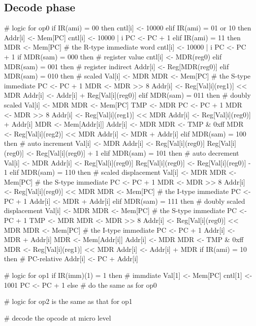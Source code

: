 \documentclass[12pt]{article}
\begin{document}
\subsection{Decode phase}
\begin{verbatimtab}
# logic for op0
if IR(ami) = 00 then
	cntl[i] <- 10000
elif IR(ami) = 01 or 10 then
	Addr[i] <- Mem[PC]
	cntl[i] <- 10000 | i
	PC <- PC + 1
elif IR(ami) = 11 then
	MDR <- Mem[PC] # the R-type immediate word
	cntl[i] <- 10000 | i
	PC <- PC + 1
	if MDR(sam) = 000 then # register value
		cntl[i] <- MDR(reg0)
	elif MDR(sam) = 001 then # register indirect
		Addr[i] <- Reg[MDR(reg0)]
	elif MDR(sam) = 010 then # scaled
		Val[i] <- MDR
		MDR <- Mem[PC] # the S-type immediate
		PC <- PC + 1
		MDR <- MDR >> 8
		Addr[i] <- Reg[Val[i](reg1)] << MDR
		Addr[i] <- Addr[i] + Reg[Val[i](reg0)]
	elif MDR(sam) = 011 then # doubly scaled
                Val[i] <- MDR
                MDR <- Mem[PC]
                TMP <- MDR
                PC <- PC + 1
                MDR <- MDR >> 8
                Addr[i] <- Reg[Val[i](reg1)] << MDR
                Addr[i] <- Reg[Val[i](reg0)] + Addr[i]
                MDR <- Mem[Addr[i]]
                Addr[i] <- MDR
                MDR <- TMP & 0xff
                MDR <- Reg[Val[i](reg2)] << MDR
                Addr[i] <- MDR + Addr[i]
	elif MDR(sam) = 100 then # auto increment
		Val[i] <- MDR
		Addr[i] <- Reg[Val[i](reg0)]
		Reg[Val[i](reg0)] <- Reg[Val[i](reg0)] + 1
	elif MDR(sam) = 101 then # auto decrement
		Val[i] <- MDR
		Addr[i] <- Reg[Val[i](reg0)]
		Reg[Val[i](reg0)] <- Reg[Val[i](reg0)] - 1
	elif MDR(sam) = 110 then # scaled displacement
		Val[i] <- MDR
		MDR <- Mem[PC] # the S-type immediate
		PC <- PC + 1
		MDR <- MDR >> 8
		Addr[i] <- Reg[Val[i](reg0)] << MDR
		MDR <- Mem[PC] # the I-type immediate
		PC <- PC + 1
		Addr[i] <- MDR + Addr[i]
	elif MDR(sam) = 111 then # doubly scaled displacement
		Val[i] <- MDR
		MDR <- Mem[PC] # the S-type immediate
		PC <- PC + 1
		TMP <- MDR
		MDR <- MDR >> 8
		Addr[i] <- Reg[Val[i](reg0)] << MDR
		MDR <- Mem[PC] # the I-type immediate
		PC <- PC + 1
		Addr[i] <- MDR + Addr[i]
		MDR <- Mem[Addr[i]]
		Addr[i] <- MDR
		MDR <- TMP & 0xff
		MDR <- Reg[Val[i](reg1)] << MDR
		Addr[i] <- Addr[i] + MDR
if IR(ami) = 10 then # PC-relative
	Addr[i] <- PC + Addr[i]

# logic for op1
if IR(imm)(1) = 1 then # immdiate
	Val[1] <- Mem[PC]
	cntl[1] <- 1001
	PC <- PC + 1
else
	# do the same as for op0

# logic for op2 is the same as that for op1

# decode the opcode at micro level
\end{verbatimtab}
\end{document}
